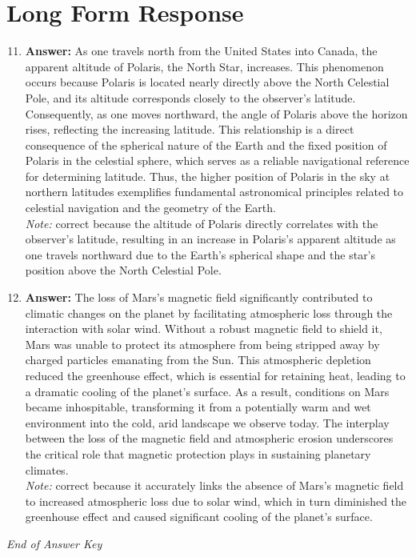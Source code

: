 \documentclass[12pt]{article}
\begin{document}
\section*{Long Form Response}
\begin{enumerate}[label=\arabic*.]
\setcounter{enumi}{10}
\item \textbf{Answer:} As one travels north from the United States into Canada, the apparent altitude of Polaris, the North Star, increases. This phenomenon occurs because Polaris is located nearly directly above the North Celestial Pole, and its altitude corresponds closely to the observer's latitude. Consequently, as one moves northward, the angle of Polaris above the horizon rises, reflecting the increasing latitude. This relationship is a direct consequence of the spherical nature of the Earth and the fixed position of Polaris in the celestial sphere, which serves as a reliable navigational reference for determining latitude. Thus, the higher position of Polaris in the sky at northern latitudes exemplifies fundamental astronomical principles related to celestial navigation and the geometry of the Earth.
\\ \textit{Note:} correct because the altitude of Polaris directly correlates with the observer's latitude, resulting in an increase in Polaris's apparent altitude as one travels northward due to the Earth's spherical shape and the star's position above the North Celestial Pole.
\item \textbf{Answer:} The loss of Mars's magnetic field significantly contributed to climatic changes on the planet by facilitating atmospheric loss through the interaction with solar wind. Without a robust magnetic field to shield it, Mars was unable to protect its atmosphere from being stripped away by charged particles emanating from the Sun. This atmospheric depletion reduced the greenhouse effect, which is essential for retaining heat, leading to a dramatic cooling of the planet's surface. As a result, conditions on Mars became inhospitable, transforming it from a potentially warm and wet environment into the cold, arid landscape we observe today. The interplay between the loss of the magnetic field and atmospheric erosion underscores the critical role that magnetic protection plays in sustaining planetary climates.
\\ \textit{Note:} correct because it accurately links the absence of Mars's magnetic field to increased atmospheric loss due to solar wind, which in turn diminished the greenhouse effect and caused significant cooling of the planet's surface.
\end{enumerate}

\vfill
\noindent\textit{End of Answer Key}
\end{document}
